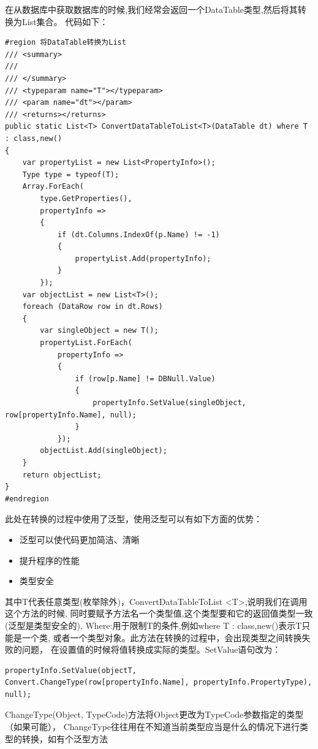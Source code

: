 \documentclass{book}
\begin{document}
在从数据库中获取数据库的时候,我们经常会返回一个DataTable类型,然后将其转换为List集合。
代码如下：

\begin{lstlisting}[language={[Sharp]C},caption=将DataTable转换为List]
#region 将DataTable转换为List
/// <summary>
/// 
/// </summary>
/// <typeparam name="T"></typeparam>
/// <param name="dt"></param>
/// <returns></returns>
public static List<T> ConvertDataTableToList<T>(DataTable dt) where T : class,new()
{
    var propertyList = new List<PropertyInfo>();
    Type type = typeof(T);
    Array.ForEach(
        type.GetProperties(),
        propertyInfo =>
        {
            if (dt.Columns.IndexOf(p.Name) != -1)
            {
                propertyList.Add(propertyInfo);
            }
        });
    var objectList = new List<T>();
    foreach (DataRow row in dt.Rows)
    {
        var singleObject = new T();
        propertyList.ForEach(
            propertyInfo =>
            {
                if (row[p.Name] != DBNull.Value)
                {
                    propertyInfo.SetValue(singleObject, row[propertyInfo.Name], null);
                }
            });
        objectList.Add(singleObject);
    }
    return objectList;
}
#endregion
\end{lstlisting}

此处在转换的过程中使用了泛型，使用泛型可以有如下方面的优势：

\begin{itemize}
\item{泛型可以使代码更加简洁、清晰}
\item{提升程序的性能}
\item{类型安全}
\end{itemize}

其中T代表任意类型(枚举除外)，ConvertDataTableToList <T>,说明我们在调用这个方法的时候,
同时要赋予方法名一个类型值,这个类型要和它的返回值类型一致(泛型是类型安全的),
Where:用于限制T的条件,例如where T : class,new()表示T只能是一个类,
或者一个类型对象。此方法在转换的过程中，会出现类型之间转换失败的问题，
在设置值的时候将值转换成实际的类型。SetValue语句改为：

\begin{lstlisting}[language={[Sharp]C}]
propertyInfo.SetValue(objectT, Convert.ChangeType(row[propertyInfo.Name], propertyInfo.PropertyType), null);
\end{lstlisting}

ChangeType(Object, TypeCode)方法将Object更改为TypeCode参数指定的类型（如果可能），
ChangeType往往用在不知道当前类型应当是什么的情况下进行类型的转换，如有个泛型方法
\end{document}
